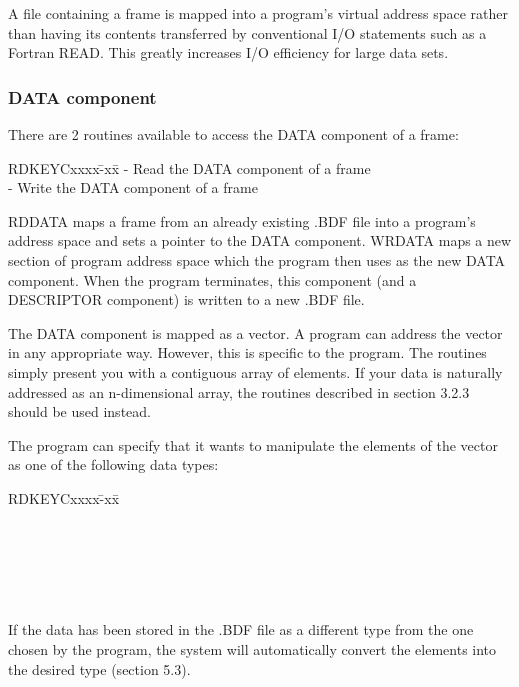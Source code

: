 \documentclass{article}
\begin{document}
A file containing a frame is mapped into a program's virtual address space
rather than having its contents transferred by conventional I/O statements
such as a Fortran READ.
This greatly increases I/O efficiency for large data sets.
\subsubsection {DATA component}
There are 2 routines available to access the DATA component of a frame:
\begin{tabbing}
\hspace{40mm}RDKEYCxxxx\=-xx\=\kill
\hspace{40mm}{\bf RDDATA} \>- \>Read the DATA component of a frame\\
\hspace{40mm}{\bf WRDATA} \>- \>Write the DATA component of a frame
\end{tabbing}
RDDATA maps a frame from an already existing .BDF file into a program's
address space and sets a pointer to the DATA component.
WRDATA maps a new section of program address space which the program then
uses as the new DATA component.
When the program terminates, this component (and a DESCRIPTOR component)
is written to a new .BDF file.

The DATA component is mapped as a vector.
A program can address the vector in any appropriate way.
However, this is specific to the program.
The routines simply present you with a contiguous array of elements.
If your data is naturally addressed as an n-dimensional array, the routines
described in section 3.2.3 should be used instead.

The program can specify that it wants to manipulate the elements of the vector
as one of the following data types:
\begin{tabbing}
\hspace{40mm}RDKEYCxxxx\=-xx\=\kill
\hspace{40mm}{\bf Signed Byte}\\
\hspace{40mm}{\bf Signed Word}\\
\hspace{40mm}{\bf Signed Longword}\\
\hspace{40mm}{\bf Real}\\
\hspace{40mm}{\bf Double Precision}\\
\hspace{40mm}{\bf Unsigned Byte}\\
\hspace{40mm}{\bf Unsigned Word}
\end{tabbing}
If the data has been stored in the .BDF file as a different type from
the one chosen by the program, the system will automatically convert the
elements into the desired type (section 5.3).
\end{document}
